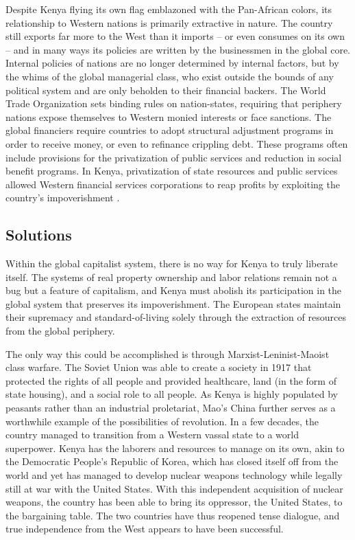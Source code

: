 \documentclass[american]{../../../coursework}
\begin{document}
Despite Kenya flying its own flag emblazoned with the Pan-African colors, its
relationship to Western nations is primarily extractive in nature. The country
still exports far more to the West than it imports -- or even consumes on its
own -- and in many ways its policies are written by the businessmen in the
global core. Internal policies of nations are no longer determined by internal
factors, but by the whims of the global managerial class, who exist outside
the bounds of any political system and are only beholden to their financial
backers. The World Trade Organization sets binding rules on nation-states,
requiring that periphery nations expose themselves to Western monied interests
or face sanctions. The global financiers require countries to adopt structural
adjustment programs in order to receive money, or even to refinance crippling
debt. These programs often include provisions for the privatization of public
services and reduction in social benefit programs. In Kenya, privatization of
state resources and public services allowed Western financial services
corporations to reap profits by exploiting the country's impoverishment
\parencite{McMichael2004}.


\subsection{Solutions}

Within the global capitalist system, there is no way for Kenya to truly
liberate itself. The systems of real property ownership and labor relations
remain not a bug but a feature of capitalism, and Kenya must abolish its
participation in the global system that preserves its impoverishment. The
European states maintain their supremacy and standard-of-living solely through
the extraction of resources from the global periphery.

The only way this could be accomplished is through Marxist-Leninist-Maoist
class warfare. The Soviet Union was able to create a society in 1917 that
protected the rights of all people and provided healthcare, land (in the form
of state housing), and a social role to all people. As Kenya is highly
populated by peasants rather than an industrial proletariat, Mao's China
further serves as a worthwhile example of the possibilities of revolution. In
a few decades, the country managed to transition from a Western vassal state
to a world superpower. Kenya has the laborers and resources to manage on its
own, akin to the Democratic People's Republic of Korea, which has closed
itself off from the world and yet has managed to develop nuclear weapons
technology while legally still at war with the United States. With this
independent acquisition of nuclear weapons, the country has been able to bring
its oppressor, the United States, to the bargaining table. The two countries
have thus reopened tense dialogue, and true independence from the West appears
to have been successful.
\end{document}
